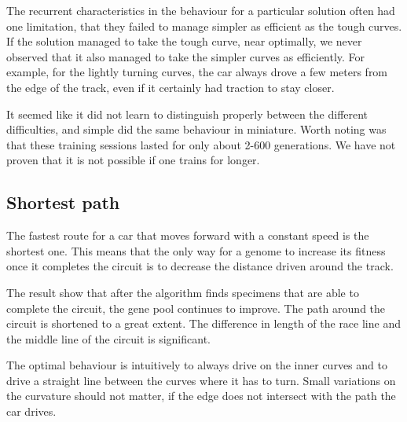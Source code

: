 The recurrent characteristics in the behaviour for a particular solution often had one limitation, that they failed to manage simpler as efficient as the tough curves. If the solution managed to take the tough curve, near optimally, we never observed that it also managed to take the simpler curves as efficiently. For example, for the lightly turning curves, the car always drove a few meters from the edge of the track, even if it certainly had traction to stay closer. 

It seemed like it did not learn to distinguish properly between the different difficulties, and simple did the same behaviour in miniature. Worth noting was that these training sessions lasted for only about 2-600 generations. We have not proven that it is not possible if one trains for longer.



\subsection{Shortest path}

The fastest route for a car that moves forward with a constant speed is the shortest one. This means that the only way for a genome to increase its fitness once it completes the circuit is to decrease the distance driven around the track.  

The result show that after the algorithm finds specimens that are able to complete the circuit, the gene pool continues to improve. The path around the circuit is shortened to a great extent. The difference in length of the race line and the middle line of the circuit is significant. 

The optimal behaviour is intuitively to always drive on the inner curves and to drive a straight line between the curves where it has to turn. Small variations on the curvature should not matter, if the edge does not intersect with the path the car drives.

